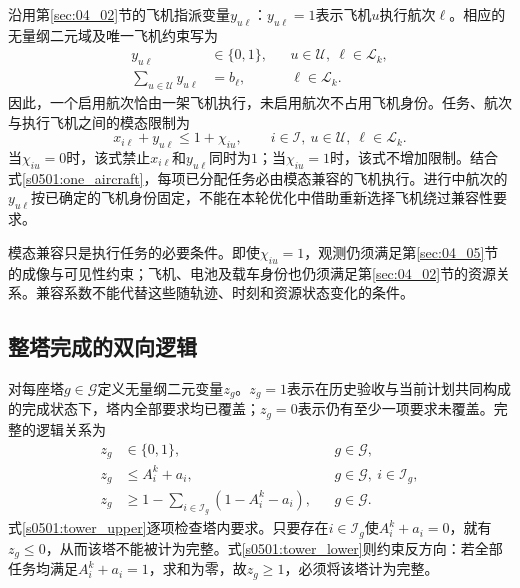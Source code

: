 沿用第\ref{sec:04_02}节的飞机指派变量$y_{u\ell}$：$y_{u\ell}=1$表示飞机$u$执行航次$\ell$。相应的无量纲二元域及唯一飞机约束写为
\begin{align}
 y_{u\ell}&\in\{0,1\},
 &&u\in\mathcal U,\ \ell\in\mathcal L_k,
 \label{s0501:aircraft_domain}\\
 \sum_{u\in\mathcal U}y_{u\ell}&=b_\ell,
 &&\ell\in\mathcal L_k.
 \label{s0501:one_aircraft}
\end{align}
因此，一个启用航次恰由一架飞机执行，未启用航次不占用飞机身份。任务、航次与执行飞机之间的模态限制为
\begin{equation}
 x_{i\ell}+y_{u\ell}\le 1+\chi_{iu},
 \qquad i\in\mathcal I,\ u\in\mathcal U,\ \ell\in\mathcal L_k.
 \label{s0501:modality_constraint}
\end{equation}
当$\chi_{iu}=0$时，该式禁止$x_{i\ell}$和$y_{u\ell}$同时为$1$；当$\chi_{iu}=1$时，该式不增加限制。结合式\eqref{s0501:one_aircraft}，每项已分配任务必由模态兼容的飞机执行。进行中航次的$y_{u\ell}$按已确定的飞机身份固定，不能在本轮优化中借助重新选择飞机绕过兼容性要求。

模态兼容只是执行任务的必要条件。即使$\chi_{iu}=1$，观测仍须满足第\ref{sec:04_05}节的成像与可见性约束；飞机、电池及载车身份也仍须满足第\ref{sec:04_02}节的资源关系。兼容系数不能代替这些随轨迹、时刻和资源状态变化的条件。

\subsection{整塔完成的双向逻辑}

对每座塔$g\in\mathcal G$定义无量纲二元变量$z_g$。$z_g=1$表示在历史验收与当前计划共同构成的完成状态下，塔内全部要求均已覆盖；$z_g=0$表示仍有至少一项要求未覆盖。完整的逻辑关系为
\begin{align}
 z_g&\in\{0,1\}, &&g\in\mathcal G,
 \label{s0501:tower_domain}\\
 z_g&\le A_i^k+a_i,
 &&g\in\mathcal G,\ i\in\mathcal I_g,
 \label{s0501:tower_upper}\\
 z_g&\ge 1-\sum_{i\in\mathcal I_g}(1-A_i^k-a_i),
 &&g\in\mathcal G.
 \label{s0501:tower_lower}
\end{align}
式\eqref{s0501:tower_upper}逐项检查塔内要求。只要存在$i\in\mathcal I_g$使$A_i^k+a_i=0$，就有$z_g\le0$，从而该塔不能被计为完整。式\eqref{s0501:tower_lower}则约束反方向：若全部任务均满足$A_i^k+a_i=1$，求和为零，故$z_g\ge1$，必须将该塔计为完整。


